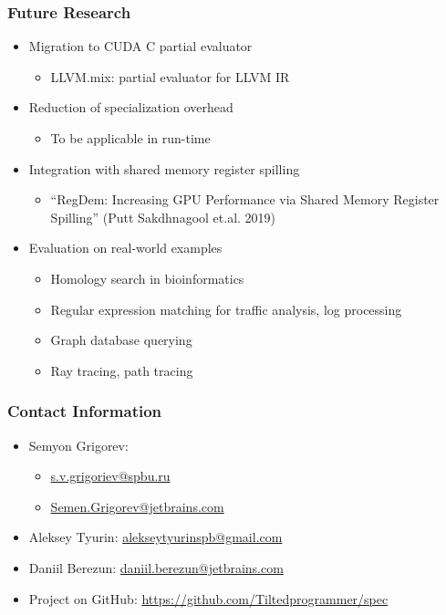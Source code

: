 \documentclass[xcolor=table]{beamer}
\begin{document}
\begin{frame}[fragile] \frametitle{Future Research}
  \begin{itemize}
    \item Migration to CUDA C partial evaluator
    \begin{itemize}
      \item LLVM.mix: partial evaluator for LLVM IR
    \end{itemize}
    \item Reduction of specialization overhead
    \begin{itemize}
      \item To be applicable in run-time
    \end{itemize}
    \item Integration with shared memory register spilling
    \begin{itemize}
      \item ``RegDem: Increasing GPU Performance via Shared Memory Register Spilling'' (Putt Sakdhnagool et.al. 2019)
    \end{itemize}
    \item Evaluation on real-world examples
    \begin{itemize}
      \item Homology search in bioinformatics
      \item Regular expression matching for traffic analysis, log processing
      \item Graph database querying
      \item Ray tracing, path tracing
    \end{itemize}
  \end{itemize}
\end{frame}

\begin{frame}
\frametitle{Contact Information}
\begin{itemize}
  \item Semyon Grigorev:
    \begin{itemize}
      \item \href{mailto:s.v.grigoriev@spbu.ru}{s.v.grigoriev@spbu.ru}
      \item \href{mailto:Semen.Grigorev@jetbrains.com}{Semen.Grigorev@jetbrains.com}
    \end{itemize}

  \item Aleksey Tyurin: \href{mailto:alekseytyurinspb@gmail.com}{alekseytyurinspb@gmail.com}
  \item Daniil Berezun: \href{mailto:daniil.berezun@jetbrains.com}{daniil.berezun@jetbrains.com}

  \vspace{0.5cm}
  \item Project on GitHub: \url{https://github.com/Tiltedprogrammer/spec}
\end{itemize}
\vspace{0.1cm}
\end{frame}
\end{document}
